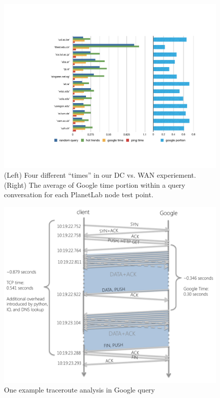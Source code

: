 \begin{figure}[!htb]
  \centering
  \includegraphics[width=\linewidth]{../figs/data_center.pdf}
  \caption{(Left) Four different ``times'' in our DC vs. WAN experiement. (Right) The average of Google time portion within a query conversation for each PlanetLab node test point.}
  \label{fig:data_center}
\end{figure}

\begin{figure}[!htb]
  \centering
  \includegraphics[width=\linewidth]{../figs/tcpdump.pdf}
  \caption{One example traceroute analysis in Google query}
  \label{fig:tcpdump}
\end{figure}


